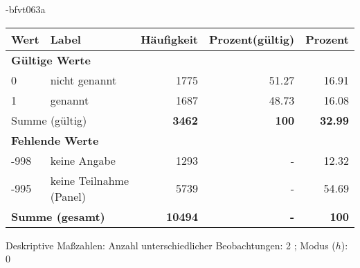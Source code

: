                 \vspace*{-\baselineskip}
					\begin{filecontents}{\jobname-bfvt063a}
					\begin{longtable}{lXrrr}
					\toprule
					\textbf{Wert} & \textbf{Label} & \textbf{Häufigkeit} & \textbf{Prozent(gültig)} & \textbf{Prozent} \\
					\endhead
					\midrule
					\multicolumn{5}{l}{\textbf{Gültige Werte}}\\

					0 &
					\multicolumn{1}{X}{ nicht genannt   } &


					  \num{1775} &
					  \num[round-mode=places,round-precision=2]{51.27} &
					    \num[round-mode=places,round-precision=2]{16.91} \\

					1 &
					\multicolumn{1}{X}{ genannt   } &


					  \num{1687} &
					  \num[round-mode=places,round-precision=2]{48.73} &
					    \num[round-mode=places,round-precision=2]{16.08} \\
					\midrule
					\multicolumn{2}{l}{Summe (gültig)} &
					  \textbf{\num{3462}} &
					\textbf{\num{100}} &
					  \textbf{\num[round-mode=places,round-precision=2]{32.99}} \\
					\multicolumn{5}{l}{\textbf{Fehlende Werte}}\\
							-998 &
							keine Angabe &
							  \num{1293} &
							 - &
							  \num[round-mode=places,round-precision=2]{12.32} \\
							-995 &
							keine Teilnahme (Panel) &
							  \num{5739} &
							 - &
							  \num[round-mode=places,round-precision=2]{54.69} \\
					\midrule
					\multicolumn{2}{l}{\textbf{Summe (gesamt)}} &
				      \textbf{\num{10494}} &
				    \textbf{-} &
				    \textbf{\num{100}} \\
					\bottomrule
					\end{longtable}
					\end{filecontents}
				\label{tableValues:bfvt063a}
				\vspace*{-\baselineskip}
                    \begin{noten}
                	    \note{} Deskriptive Maßzahlen:
                	    Anzahl unterschiedlicher Beobachtungen: 2%
                	    ; 
                	      Modus ($h$): 0
                     \end{noten}

